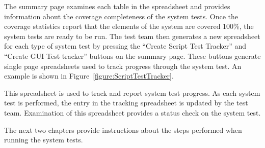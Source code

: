 The summary page examines each table in the spreadsheet and provides information about the
coverage completeness of the system tests.  Once the coverage statistics report that the elements
of the system are covered 100\%, the system tests are ready to be run.  The test team then
generates a new spreadsheet for each type of system test by pressing the ``Create Script Test
Tracker'' and ``Create GUI Test tracker'' buttons on the summary page.  These buttons generate
single page spreadsheets used to track progress through the system test.  An example is shown in
Figure~\ref{figure:ScriptTestTracker}.

This spreadsheet is used to track and report system test progress.  As each system test is
performed, the entry in the tracking spreadsheet is updated by the test team.  Examination of this
spreadsheet provides a status check on the system test.

The next two chapters provide instructions about the steps performed when running the system tests.
